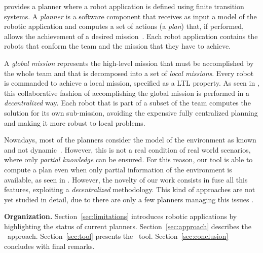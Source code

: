 
\toolName provides a planner where a robot application is defined using finite transition systems.
A \emph{planner} is  a software component that receives as input a model of the robotic application and computes  a set of actions (a \emph{plan}) that, if performed, allows the achievement of a desired mission~\cite{latombe2012robot}.
Each robot application contains the robots that conform the team and the mission that they have to achieve.

A \emph{global mission} represents the high-level mission that must be accomplished by the whole team \cite{kloetzer2011multi,loizou2005automated,quottrup2004multi} and that is decomposed into a set of \emph{local missions}\cite{schillinger2016decomposition,guo2015multi,guo2015multi,tumova2016multi}.
Every robot is commanded to achieve a local mission, specified as a LTL property.
As seen in \cite{tumova2016multi}, this collaborative fashion of accomplishing the global mission is performed in a \emph{decentralized} way.
Each robot that is part of a subset of the team computes the solution for its own sub-mission, avoiding the expensive fully centralized planning and making it more robust to local problems.

Nowadays, most of the planners consider the model of the environment as known and not dynamic~\cite{7139412}. 
However, this is not a real condition of real world scenarios, where only \emph{partial knowledge} can be ensured.
For this reason, our tool is able to compute a plan even when only partial information of the environment is available, as seen in \cite{roy2006planning,du2012robot,diaz2001exploring}.
However, the novelty of our work consists in fuse all this features, exploiting a \emph{decentralized} methodology.
This kind of approaches are not yet studied in detail, due to there are only a few planners managing this issues \cite{guo2015multi}.

\textbf{Organization.} 
Section~\ref{sec:limitations} introduces robotic applications by highlighting the status of current planners.
Section~\ref{sec:approach} describes the \toolName\ approach.
Section~\ref{sec:tool} presents the \toolName\ tool.
Section~\ref{sec:conclusion} concludes with final remarks.